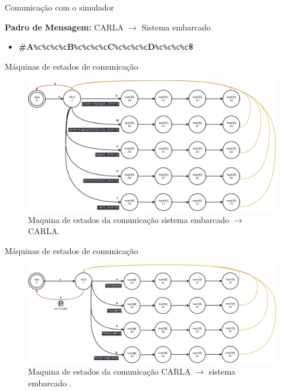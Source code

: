 \documentclass{if-beamer}
\begin{document}
\begin{frame}{Comunicação com o simulador}
\begin{block}{}
\begin{itemize}
		\end{itemize}
		
		\textbf{Padro de Mensagem:} CARLA $\longrightarrow$ Sistema embarcado
		\begin{itemize}
			\item \textbf{\#A}\texttt{\%c\%c\%c\%c}\textbf{B}\texttt{\%c\%c\%c\%c}\textbf{C}\texttt{\%c\%c\%c\%c}\textbf{D}\texttt{\%c\%c\%c\%c}\textbf{\$}
			
		\end{itemize}
		
	\end{block}
	
\end{frame}

\begin{frame}{Máquinas de estados de comunicação}
	
	\begin{figure}[H]
		\centering
		\includegraphics[width=0.9\linewidth]{sm_uc_2_carla}
		\caption{Maquina de estados da comunicação sistema embarcado $\longrightarrow$ CARLA.}
		\label{fig:sm_uc_2_carla}
	\end{figure}
	
\end{frame}

\begin{frame}{Máquinas de estados de comunicação}
	
	\begin{figure}[H]
		\centering
		\includegraphics[width=\linewidth]{sm_carla_2_uc}
		\caption{Maquina de estados da comunicação CARLA $\longrightarrow$ sistema embarcado .}
		\label{fig:sm_carla_2_uc}
	\end{figure}

\end{frame}
\end{document}
